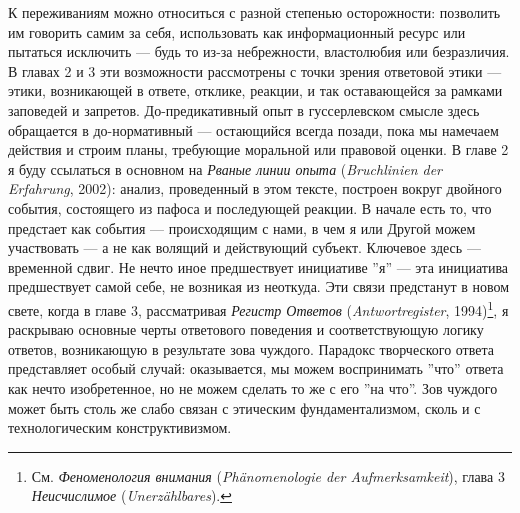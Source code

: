 \documentclass[12pt]{book}
\begin{document}
К переживаниям можно относиться с разной степенью осторожности: позволить им говорить самим за себя, использовать как информационный ресурс или пытаться исключить --- будь то из-за небрежности, властолюбия или безразличия. В главах 2 и 3 эти возможности рассмотрены с точки зрения ответовой этики --- этики, возникающей в ответе, отклике, реакции, и так оставающейся за рамками заповедей и запретов. До-предикативный опыт в гуссерлевском смысле здесь обращается в до-нормативный --- остающийся всегда позади, пока мы намечаем действия и строим планы, требующие моральной или правовой оценки. В главе 2 я буду ссылаться в основном на \textit{Рваные линии опыта} (\textit{Bruchlinien der Erfahrung}, 2002): анализ, проведенный в этом тексте, построен вокруг двойного события, состоящего из пафоса и последующей реакции. В начале есть то, что предстает как события --- происходящим с нами, в чем я или Другой можем участвовать --- а не как волящий и действующий субъект. Ключевое здесь --- временной сдвиг. Не нечто иное предшествует инициативе ''я'' --- эта инициатива предшествует самой себе, не возникая из неоткуда. Эти связи предстанут в новом свете, когда в главе 3, рассматривая \textit{Регистр Ответов} (\textit{Antwortregister}, 1994)\footnote{См. \textit{Феноменология внимания} (\textit{Phänomenologie der Aufmerksamkeit}), глава 3 \textit{Неисчислимое} (\textit{Unerzählbares}).}, я раскрываю основные черты ответового поведения и соответствующую логику ответов, возникающую в результате зова чуждого. Парадокс творческого ответа представляет особый случай: оказывается, мы можем воспринимать ''что'' ответа как нечто изобретенное, но не можем сделать то же с его ''на что''. Зов чуждого может быть столь же слабо связан с этическим фундаментализмом, сколь и с технологическим конструктивизмом.
\end{document}
